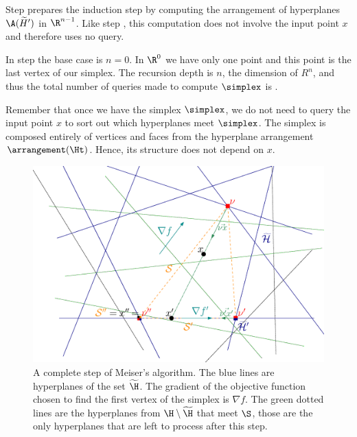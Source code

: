 Step  prepares the induction step by computing the arrangement of
hyperplanes \(\A(\widetilde{H}')\) in \(\R^{n-1}\). Like step , this
computation does not involve the input point \(x\) and therefore uses no query.

In step  the base case is $n = 0$. In $\R^0$ we have only one point
and this point is the last vertex of our simplex.
The recursion depth is $n$, the dimension of $R^n$, and thus the total number
of queries made to compute $\simplex$ is .

Remember that once we have the simplex $\simplex$, we do not need to query the
input point $x$ to sort out which hyperplanes meet $\simplex$. The simplex is
composed entirely of vertices and faces from the hyperplane arrangement
$\arrangement(\Ht)$. Hence, its structure does not depend on $x$.

\begin{figure}
\begin{center}
\includegraphics[trim=110 40 50 30,clip=true,height=0.3\textheight]{fig/point-location/simplex.eps}
\caption{
A complete step of Meiser's algorithm. The blue lines are hyperplanes of the
set \(\widetilde{\H}\). The gradient of the objective function
chosen to find the first vertex of the simplex is \(\nabla f\). The green dotted lines are the
hyperplanes from \(\H \setminus \widetilde{\H}\) that meet \(\S\), those are
the only hyperplanes that are left to process after this step.
}
\label{fig:meiser:step}
\end{center}
\end{figure}

